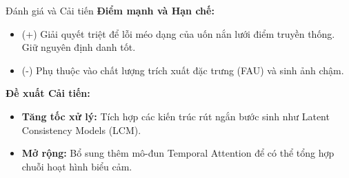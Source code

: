 \begin{frame}{Đánh giá và Cải tiến}
    \textbf{Điểm mạnh và Hạn chế:}
    \begin{itemize}
        \item (+) Giải quyết triệt để lỗi méo dạng của uốn nắn lưới điểm truyền thống. Giữ nguyên định danh tốt.
        \item (-) Phụ thuộc vào chất lượng trích xuất đặc trưng (FAU) và sinh ảnh chậm.
    \end{itemize}
    \vspace{0.3cm}

    \textbf{Đề xuất Cải tiến:}
    \begin{itemize}
        \item \textbf{Tăng tốc xử lý:} Tích hợp các kiến trúc rút ngắn bước sinh như Latent Consistency Models (LCM).
        \item \textbf{Mở rộng:} Bổ sung thêm mô-đun Temporal Attention để có thể tổng hợp chuỗi hoạt hình biểu cảm.
    \end{itemize}
\end{frame}
